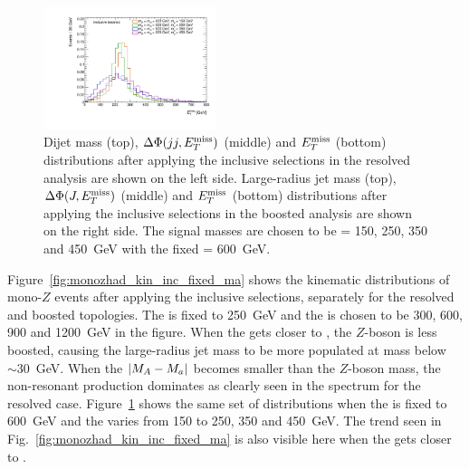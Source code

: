 \begin{figure}
\includegraphics[width=0.45\textwidth]{texinputs/04_grid/figures/monoz/hadronic/mA600_incl_merged_MET_linear.pdf}
\caption{Dijet mass (top), $\Delta\Phi(jj, E_T^\mathrm{miss})$ (middle) and $E_T^\mathrm{miss}$ (bottom) distributions 
after applying the inclusive selections in the resolved analysis are shown on the left side. Large-radius 
jet mass (top), $\Delta\Phi(J, E_T^\mathrm{miss})$ (middle) and $E_T^\mathrm{miss}$ (bottom) distributions 
after applying the inclusive selections in the boosted analysis are shown on the right side. 
The signal masses are chosen to be \ma = 150, 250, 350 and 450~GeV with the fixed \mA = 600~GeV.}
\label{fig:monozhad_kin_inc_fixed_mA}
\end{figure}

Figure~\ref{fig:monozhad_kin_inc_fixed_ma} shows the kinematic distributions of mono-$Z$ events after applying 
the inclusive selections, separately for the resolved and boosted topologies. The \ma is fixed to 250~GeV and the \mA is
chosen to be 300, 600, 900 and 1200~GeV in the figure. When the \mA gets closer to \ma, the $Z$-boson
is less boosted, causing the large-radius jet mass to be more populated at mass below $\sim30$~GeV. 
When the $|M_{A}-M_{a}|$ becomes smaller than the $Z$-boson mass, the non-resonant production dominates as clearly
seen in the \MET spectrum for the resolved case.
Figure~\ref{fig:monozhad_kin_inc_fixed_mA} shows the same set of distributions when the \mA is fixed to 600~GeV 
and the \ma varies from 150 to 250, 350 and 450~GeV. 
The trend seen in Fig.~\ref{fig:monozhad_kin_inc_fixed_ma} is also visible here when the \ma gets closer to \mA.


